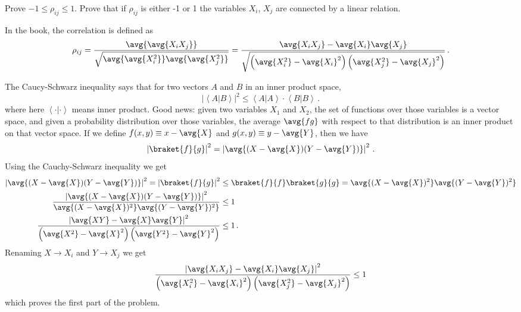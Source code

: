 

Prove $-1 \leq \rho_{ij} \leq 1$.
Prove that if $\rho_{ij}$ is either -1 or 1 the variables $X_i$, $X_j$ are connected by a linear relation.

In the book, the correlation is defined as
\begin{equation*}
\rho_{ij}
= \frac{\avg{\avg{X_i X_j}}}{\sqrt{\avg{\avg{X_i^2}} \avg{\avg{X_j^2}}}}
= \frac{\avg{X_i X_j}
- \avg{X_i}\avg{X_j}}{
\sqrt{\left(\avg{X_i^2} - \avg{X_i}^2 \right) \left( \avg{X_j^2} - \avg{X_j}^2 \right)}
} \, .
\end{equation*}


The Caucy-Schwarz inequality says that for two vectors $A$ and $B$ in an inner product space,
\begin{equation*}
\left\lvert \left \langle A | B \right \rangle \right\vert ^2
\leq \left\langle A | A \right\rangle \cdot \left\langle B | B \right\rangle \, .
\end{equation*}
where here $\left \langle \cdot | \cdot \right \rangle$ means inner product.
Good news: given two variables $X_1$ and $X_2$, the set of functions over those variables is a vector space, and given a probability distribution over those variables, the average $\avg{f g}$ with respect to that distribution is an inner product on that vector space.
If we define $f(x,y) \equiv x - \avg{X}$ and $g(x,y) \equiv y - \avg{Y}$, then we have
\begin{equation*}
\left \lvert \braket{f}{g} \right \rvert^2
= \left \lvert \avg{(X - \avg{X})(Y - \avg{Y})} \right \rvert^2 \, .
\end{equation*}
Using the Cauchy-Schwarz inequality we get
\begin{align*}
\left \lvert \avg{(X - \avg{X})(Y - \avg{Y})} \right \rvert^2
= \left \lvert \braket{f}{g} \right \rvert^2
&\leq \braket{f}{f} \braket{g}{g}
= \avg{(X - \avg{X})^2} \avg{(Y - \avg{Y})^2} \\
\frac{
\left \lvert \avg{(X - \avg{X})(Y - \avg{Y})} \right \rvert^2}
{
\avg{(X - \avg{X})^2} \avg{(Y - \avg{Y})^2}}
&\leq 1 \\
\frac{
\left \lvert \avg{XY} - \avg{X}\avg{Y} \right \rvert^2}
{
\left(\avg{X^2} - \avg{X}^2 \right) \left( \avg{Y^2} - \avg{Y}^2 \right)}
&\leq 1 \, .
\end{align*}
Renaming $X \rightarrow X_i$ and $Y \rightarrow X_j$ we get\
\begin{equation*}
\frac{
\left \lvert \avg{X_i X_j} - \avg{X_i}\avg{X_j} \right \rvert^2}
{
\left(\avg{X_i^2} - \avg{X_i}^2 \right) \left( \avg{X_j^2} - \avg{X_j}^2 \right)}
\leq 1
\end{equation*}
which proves the first part of the problem.
